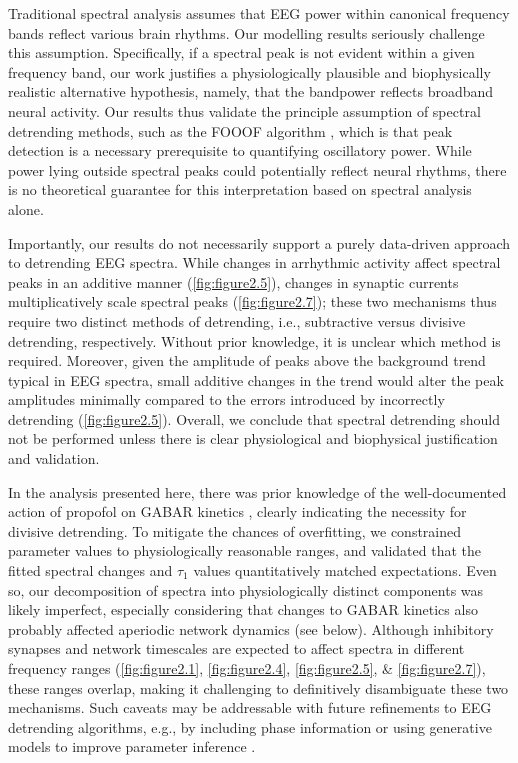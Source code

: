 Traditional spectral analysis assumes that EEG power within canonical frequency bands reflect various brain rhythms. Our modelling results seriously challenge this assumption. Specifically, if a spectral peak is not evident within a given frequency band, our work justifies a physiologically plausible and biophysically realistic alternative hypothesis, namely, that the bandpower reflects broadband neural activity. Our results thus validate the principle assumption of spectral detrending methods, such as the FOOOF algorithm \cite{Donoghue2020}, which is that peak detection is a necessary prerequisite to quantifying oscillatory power. While power lying outside spectral peaks could potentially reflect neural rhythms, there is no theoretical guarantee for this interpretation based on spectral analysis alone. 

Importantly, our results do not necessarily support a purely data-driven approach to detrending EEG spectra. While changes in arrhythmic activity affect spectral peaks in an additive manner (\autoref{fig:figure2.5}), changes in synaptic currents multiplicatively scale spectral peaks (\autoref{fig:figure2.7}); these two mechanisms thus require two distinct methods of detrending, i.e., subtractive versus divisive detrending, respectively. Without prior knowledge, it is unclear which method is required. Moreover, given the amplitude of peaks above the background trend typical in EEG spectra, small additive changes in the trend would alter the peak amplitudes minimally compared to the errors introduced by incorrectly detrending (\autoref{fig:figure2.5}). Overall, we conclude that spectral detrending should not be performed unless there is clear physiological and biophysical justification and validation. 

In the analysis presented here, there was prior knowledge of the well-documented action of propofol on GABAR kinetics \cite{Kitamura2003, Orser1994, Whittington1996}, clearly indicating the necessity for divisive detrending. To mitigate the chances of overfitting, we constrained parameter values to physiologically reasonable ranges, and validated that the fitted spectral changes and $\tau_1$ values quantitatively matched expectations. Even so, our decomposition of spectra into physiologically distinct components was likely imperfect, especially considering that changes to GABAR kinetics also probably affected aperiodic network dynamics \cite{Li2020} (see below). Although inhibitory synapses and network timescales are expected to affect spectra in different frequency ranges (\autoref{fig:figure2.1}, \ref{fig:figure2.4}, \ref{fig:figure2.5}, \& \ref{fig:figure2.7}), these ranges overlap, making it challenging to definitively disambiguate these two mechanisms. Such caveats may be addressable with future refinements to EEG detrending algorithms, e.g., by including phase information or using generative models to improve parameter inference \cite{Zeraati2022}. 

